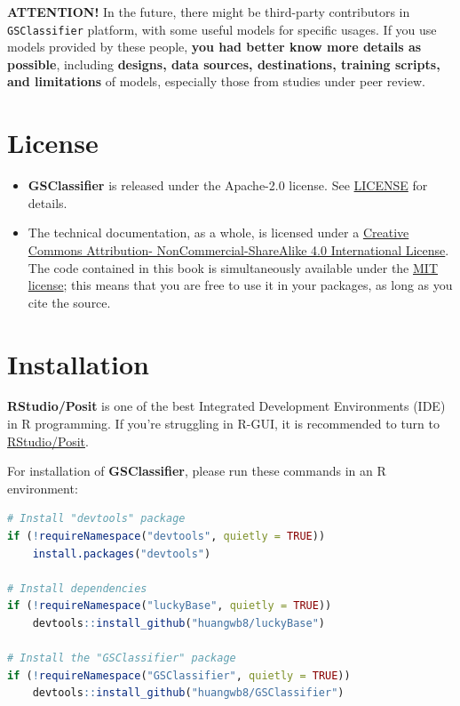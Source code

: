 \documentclass[
  12pt,
]{book}
\newcommand{\passthrough}[1]{#1}
\begin{document}
\textbf{ATTENTION!} In the future, there might be third-party contributors in \passthrough{\lstinline!GSClassifier!} platform, with some useful models for specific usages. If you use models provided by these people, \textbf{you had better know more details as possible}, including \textbf{designs, data sources, destinations, training scripts, and limitations} of models, especially those from studies under peer review.

\hypertarget{license}{%
\section*{License}\label{license}}

\begin{itemize}
\item
  \textbf{GSClassifier} is released under the Apache-2.0 license. See \href{https://github.com/huangwb8/GSClassifier/blob/master/license.txt}{LICENSE} for details.
\item
  The technical documentation, as a whole, is licensed under a \href{http://creativecommons.org/licenses/by-nc-sa/4.0/}{Creative Commons Attribution-
  NonCommercial-ShareAlike 4.0 International License}. The code contained in this book is simultaneously available under the \href{https://opensource.org/licenses/MIT}{MIT license}; this means that you are free to use it in your packages, as long as you cite the source.
\end{itemize}

\hypertarget{installation}{%
\section*{Installation}\label{installation}}

\textbf{RStudio/Posit} is one of the best Integrated Development Environments (IDE) in R programming. If you're struggling in R-GUI, it is recommended to turn to \href{https://www.rstudio.com/}{RStudio/Posit}.

For installation of \textbf{GSClassifier}, please run these commands in an R environment:

\begin{lstlisting}[language=R]
# Install "devtools" package
if (!requireNamespace("devtools", quietly = TRUE))
    install.packages("devtools")

# Install dependencies
if (!requireNamespace("luckyBase", quietly = TRUE))
    devtools::install_github("huangwb8/luckyBase")

# Install the "GSClassifier" package
if (!requireNamespace("GSClassifier", quietly = TRUE))
    devtools::install_github("huangwb8/GSClassifier")
\end{lstlisting}
\end{document}
